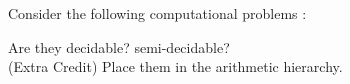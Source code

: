 \documentclass[addpoints,12pt]{exam}
\begin{document}
\begin{questions}
\question[10]
Consider the following computational problems :
Are they decidable? semi-decidable? \\[2mm]
(Extra Credit) Place them in the arithmetic hierarchy.
\end{questions}
\end{document}
